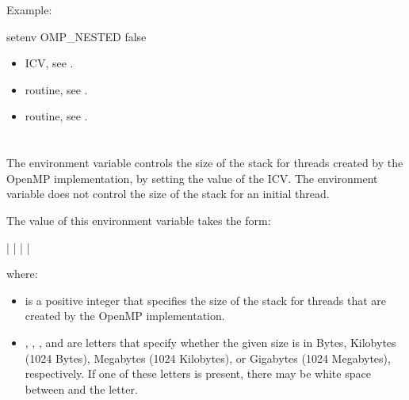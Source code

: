 Example:
\begin{boxedcode}
setenv OMP\_NESTED false
\end{boxedcode}

\crossreferences
\begin{itemize}
\item {} ICV, see .

\item {} routine, see .

\item {} routine, see .
\end{itemize}











\section{}
\label{sec:OMP_STACKSIZE}
The  environment variable controls the size of the stack for threads 
created by the OpenMP implementation, by setting the value of the  ICV. 
The environment variable does not control the size of the stack for an initial thread. 

The value of this environment variable takes the form: 

 |  |  |  | 

where: 

\begin{itemize}
\item {} is a positive integer that specifies the size of the stack for threads that are created 
by the OpenMP implementation. 

\item {}, , , and  are letters that specify 
whether the given size is in Bytes, Kilobytes 
(1024 Bytes), Megabytes (1024 Kilobytes), or Gigabytes (1024 Megabytes), 
respectively. If one of these letters is present, there may be white space between 
 and the letter.
\end{itemize}

